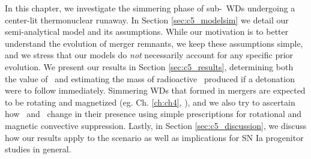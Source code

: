 In this chapter, we investigate the simmering phase of sub-\Mch\ WDs undergoing a center-lit thermonuclear runaway.  In Section \ref{sec:c5_modelsim} we detail our semi-analytical model and its assumptions.  While our motivation is to better understand the evolution of merger remnants, we keep these assumptions simple, and we stress that our models do \textit{not} necessarily account for any specific prior evolution.  We present our results in Section \ref{sec:c5_results}, determining both the value of \Mcrit\ and estimating the mass of radioactive \Ni\ produced if a detonation were to follow immediately.  Simmering WDs that formed in mergers are expected to be rotating and magnetized (eg. Ch. \ref{ch:ch4}, \citealt{wicktf14}), and we also try to ascertain how \Mcrit\ and \MNi\ change in their presence using simple prescriptions for rotational and magnetic convective suppression.  Lastly, in Section \ref{sec:c5_discussion}, we discuss how our results apply to the \citeal{vkercj10} scenario as well as implications for SN Ia progenitor studies in general.
